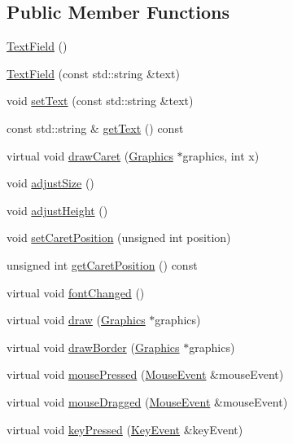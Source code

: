 \subsection*{Public Member Functions}
\begin{DoxyCompactItemize}
\item 
\hyperlink{classgcn_1_1TextField_a8348b49dd66cefd728e6d75174a13216}{Text\+Field} ()
\item 
\hyperlink{classgcn_1_1TextField_a2ee5cd927898e14cf070ea37c546015d}{Text\+Field} (const std\+::string \&text)
\item 
void \hyperlink{classgcn_1_1TextField_ad4da21d56554bc41f2666417889757bd}{set\+Text} (const std\+::string \&text)
\item 
const std\+::string \& \hyperlink{classgcn_1_1TextField_a4ab8ba2a5522c3d2163d7e4cdb0b298a}{get\+Text} () const 
\item 
virtual void \hyperlink{classgcn_1_1TextField_abf0b5531f60f50be504fedfd12bb07c8}{draw\+Caret} (\hyperlink{classgcn_1_1Graphics}{Graphics} $\ast$graphics, int x)
\item 
void \hyperlink{classgcn_1_1TextField_a5fa19c9dbe8ce775772d4ad5c995477a}{adjust\+Size} ()
\item 
void \hyperlink{classgcn_1_1TextField_a8b6a3c9f6973376e72810c00680ced8e}{adjust\+Height} ()
\item 
void \hyperlink{classgcn_1_1TextField_a01556df765b6eebaaa7f561fe080f5e1}{set\+Caret\+Position} (unsigned int position)
\item 
unsigned int \hyperlink{classgcn_1_1TextField_a8866f8d955405f2ef0542f11b3d253c1}{get\+Caret\+Position} () const 
\item 
virtual void \hyperlink{classgcn_1_1TextField_a19a47e362b1f5ca5e88e0372b5774fd8}{font\+Changed} ()
\item 
virtual void \hyperlink{classgcn_1_1TextField_aea7d866255c803a0e569fe6237c20660}{draw} (\hyperlink{classgcn_1_1Graphics}{Graphics} $\ast$graphics)
\item 
virtual void \hyperlink{classgcn_1_1TextField_ac094e85ea11edd7706044543f2c36230}{draw\+Border} (\hyperlink{classgcn_1_1Graphics}{Graphics} $\ast$graphics)
\item 
virtual void \hyperlink{classgcn_1_1TextField_aba94195f14616895a640fa0f880aa2c8}{mouse\+Pressed} (\hyperlink{classgcn_1_1MouseEvent}{Mouse\+Event} \&mouse\+Event)
\item 
virtual void \hyperlink{classgcn_1_1TextField_a7e837a5f48b10557bc3874108fde7789}{mouse\+Dragged} (\hyperlink{classgcn_1_1MouseEvent}{Mouse\+Event} \&mouse\+Event)
\item 
virtual void \hyperlink{classgcn_1_1TextField_a6dc1d5b81abdb81f4e169ed22dd849ae}{key\+Pressed} (\hyperlink{classgcn_1_1KeyEvent}{Key\+Event} \&key\+Event)
\end{DoxyCompactItemize}
